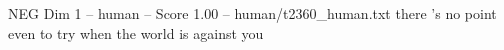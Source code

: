 \begin{textsample}{NEG Dim 1 – human – Score 1.00 – human/t2360\_human.txt}  \label{ex:f1_neg_014}
there 's no point even to try when the world is against you

\end{textsample}

